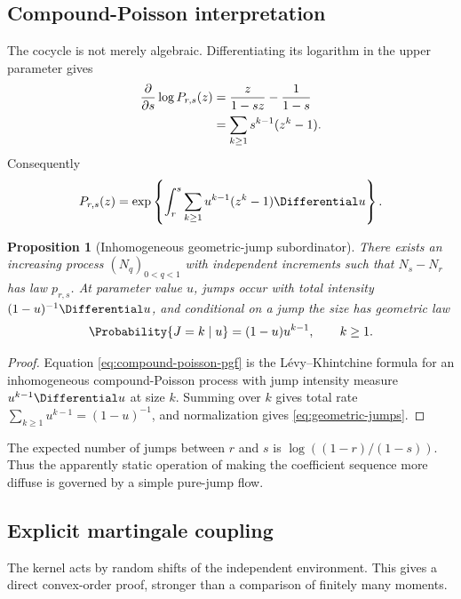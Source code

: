 \documentclass[11pt,a4paper]{article}
\newtheorem{proposition}[theorem]{Proposition}
\theoremstyle{definition}
\begin{document}
\subsection{Compound-Poisson interpretation}

The cocycle is not merely algebraic.  Differentiating its logarithm in the
upper parameter gives
\begin{align}
 \frac{\partial}{\partial s}\log P_{r,s}(z)
 &=\frac{z}{1-sz}-\frac{1}{1-s}
 \notag\\
 &=\sum_{k\ge1}s^{k-1}(z^k-1).
 \label{eq:levy-generator}
\end{align}
Consequently
\begin{equation}
 P_{r,s}(z)=
 \exp\left\{\int_r^s\sum_{k\ge1}u^{k-1}(z^k-1)\Differential u\right\}.
 \label{eq:compound-poisson-pgf}
\end{equation}

\begin{proposition}[Inhomogeneous geometric-jump subordinator]
\label{prop:subordinator}
There exists an increasing process $(N_q)_{0<q<1}$ with independent
increments such that $N_s-N_r$ has law $p_{r,s}$.  At parameter value $u$,
jumps occur with total intensity $(1-u)^{-1}\Differential u$, and conditional on a
jump the size has geometric law
\begin{equation}
 \Probability\{J=k\mid u\}=(1-u)u^{k-1},\qquad k\ge1.
 \label{eq:geometric-jumps}
\end{equation}
\end{proposition}

\begin{proof}
Equation \eqref{eq:compound-poisson-pgf} is the L\'evy--Khintchine formula
for an inhomogeneous compound-Poisson process with jump intensity measure
$u^{k-1}\Differential u$ at size $k$.  Summing over $k$ gives total rate
$\sum_{k\ge1}u^{k-1}=(1-u)^{-1}$, and normalization gives
\eqref{eq:geometric-jumps}.
\end{proof}

The expected number of jumps between $r$ and $s$ is
$\log((1-r)/(1-s))$.  Thus the apparently static operation of making the
coefficient sequence more diffuse is governed by a simple pure-jump flow.

\subsection{Explicit martingale coupling}

The kernel acts by random shifts of the independent environment.  This gives
a direct convex-order proof, stronger than a comparison of finitely many
moments.
\end{document}
